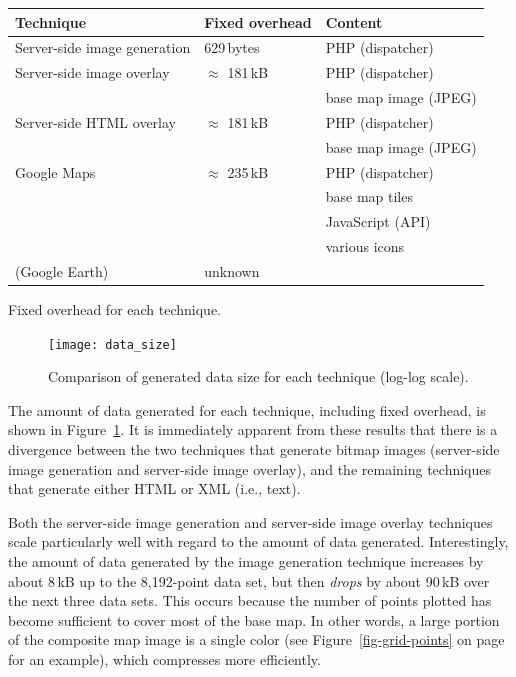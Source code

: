 \documentclass[acmtocl,acmnow]{acmtrans2m}
\begin{document}
\begin{acmtable}{11cm}
	\centering
	\begin{tabular}{lll}
		Technique						&	Fixed overhead		&	Content	\\
		\hline
		Server-side image generation	&	629\,bytes			&	PHP (dispatcher)\smallskip	\\

		Server-side image overlay		&	\(\approx\) 181\,kB	&	PHP (dispatcher) \\
										&						&	base map image (JPEG)\smallskip	\\

		Server-side HTML overlay		&	\(\approx\) 181\,kB	&	PHP (dispatcher) \\
										&						&	base map image (JPEG)\smallskip	\\

		Google Maps						&	\(\approx\) 235\,kB	&	PHP (dispatcher) \\
										&						&	base map tiles \\
										&						&	JavaScript (API) \\
										&						&	various icons\smallskip	\\

		(Google Earth)					&	unknown				&	\\
	\end{tabular}
	\caption{Fixed overhead for each technique.}
	\label{tab-overhead}
\end{acmtable}


\begin{figure}
	\texttt{[image: data\_size]}
	\caption{Comparison of generated data size for each technique (log-log scale).}
	\label{fig-data-size}
\end{figure}


The amount of data generated for each technique, including fixed
overhead, is shown in Figure~\ref{fig-data-size}. It is immediately
apparent from these results that there is a divergence between the two
techniques that generate bitmap images (server-side image generation and
server-side image overlay), and the remaining techniques that generate
either HTML or XML (i.e., text).

Both the server-side image generation and server-side image overlay
techniques scale particularly well with regard to the amount of data
generated. Interestingly, the amount of data generated by the image
generation technique increases by about 8\,kB up to the 8,192-point data
set, but then \emph{drops} by about 90\,kB over the next three data
sets. This occurs because the number of points plotted has become
sufficient to cover most of the base map. In other words, a large
portion of the composite map image is a single color (see
Figure~\ref{fig-grid-points} on page~\pageref{fig-grid-points} for an
example), which compresses more efficiently.
\end{document}
